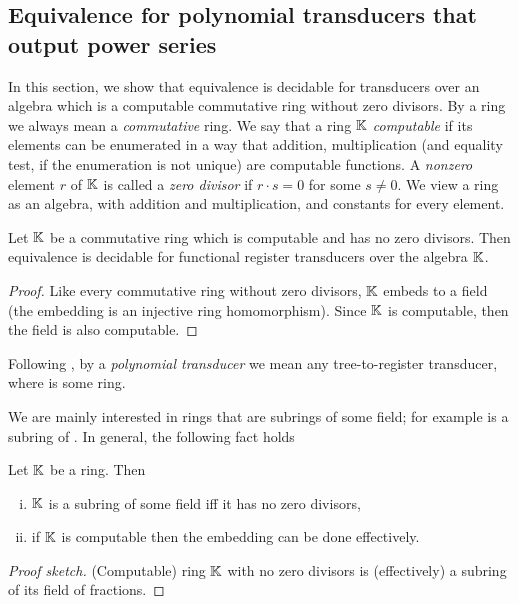 \subsection{Equivalence for polynomial transducers that output power series}\label{sec:pol-transducers-any-ring}


In this section, we show that equivalence is decidable for transducers over an algebra which is a computable commutative ring without zero divisors. 
By a ring we always mean a \emph{commutative} ring.  
We say that a ring ${\mathbb K}$ \emph{computable} if its elements can be enumerated in a way that addition, multiplication (and equality test, if the enumeration is not unique) are computable functions. A \emph{nonzero} element $r$ of ${\mathbb K}$ is called a \emph{zero divisor} if $r \cdot s = 0$ for some $s \neq 0$. We view a ring as an algebra, with addition and multiplication, and constants for every element.

\begin{theorem}\label{thm:equivalence-polynomial-automata-over-a-ring}
Let ${\mathbb K}$ be a commutative ring which is computable and has no zero divisors. Then equivalence is decidable for  functional register transducers over the algebra ${\mathbb K}$.
\end{theorem}
\begin{proof}
	Like every commutative ring without zero divisors, ${\mathbb K}$ embeds to a field (the embedding is an injective ring homomorphism). Since ${\mathbb K}$ is computable, then the field is also computable. 
\end{proof}

Following \cite{seidlManethKemper2018}, by a \emph{polynomial transducer} we mean any tree-to-\Ring register transducer, where \Ring is some ring.



We are mainly interested in rings that are subrings of some field;
for example \Z is a subring of \Q. In general, the following fact holds
\begin{lemma}\label{lem:ring-with-no-zero-divisors-subring-of-a-field}
	Let ${\mathbb K}$ be a ring. Then
	\begin{enumerate}[(i)]
		\item ${\mathbb K}$ is a subring of some field iff it has no zero divisors,
		\item if ${\mathbb K}$ is computable then the embedding can be done effectively.
	\end{enumerate}
\end{lemma}
\begin{proof}[Proof sketch]
	(Computable) ring ${\mathbb K}$ with no zero divisors is (effectively) a subring of its field of fractions.
\end{proof}


